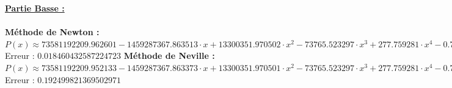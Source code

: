 \documentclass{report}
\begin{document}
      
      \noindent\underline{\textbf{Partie Basse :}} \\ \\
      \textbf{Méthode de Newton :}\\
	$P(x) \approx 73581192209.962601-1459287367.863513 \cdot x + 13300351.970502 \cdot x^{2} - 73765.523297 \cdot x^{3}  + 277.759281 \cdot x^{4} - 0.749863 \cdot x^{5}  + 0.001493 \cdot x^{6} - 0.000002 \cdot x^{7}  + 0.000000 \cdot x^{8} - 0.000000 \cdot x^{9}  + 0.000000 \cdot x^{10} - 0.000000 \cdot x^{11}  + 0.000000 \cdot x^{12} - 0.000000 \cdot x^{13} $\\
	Erreur : $0.018460432587224723$
	\newline
	\newline
	\textbf{Méthode de Neville :}\\
	$P(x) \approx 73581192209.952133-1459287367.863373 \cdot x + 13300351.970501 \cdot x^{2} - 73765.523297 \cdot x^{3}  + 277.759281 \cdot x^{4} - 0.749863 \cdot x^{5}  + 0.001493 \cdot x^{6} - 0.000002 \cdot x^{7}  + 0.000000 \cdot x^{8} - 0.000000 \cdot x^{9}  + 0.000000 \cdot x^{10} - 0.000000 \cdot x^{11}  + 0.000000 \cdot x^{12} - 0.000000 \cdot x^{13} $\\
	Erreur : $0.192499821369502971$
	\newline
	\newline
	
\end{document}
